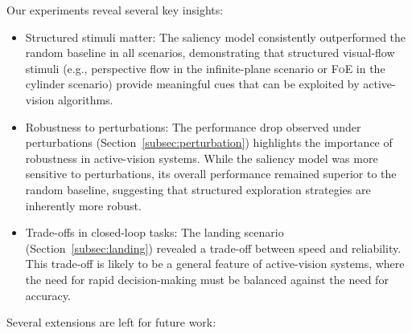 \documentclass[12pt,a4paper]{article}
\newcommand{\FoE}{\textsc{FoE}}  %
\begin{document}
Our experiments reveal several key insights:
\begin{itemize}
    \item Structured stimuli matter: The saliency model consistently outperformed the random baseline in all scenarios, demonstrating that structured visual-flow stimuli (e.g., perspective flow in the infinite-plane scenario or \FoE{} in the cylinder scenario) provide meaningful cues that can be exploited by active-vision algorithms.

    \item Robustness to perturbations: The performance drop observed under perturbations (Section~\ref{subsec:perturbation}) highlights the importance of robustness in active-vision systems. While the saliency model was more sensitive to perturbations, its overall performance remained superior to the random baseline, suggesting that structured exploration strategies are inherently more robust.

    \item Trade-offs in closed-loop tasks: The landing scenario (Section~\ref{subsec:landing}) revealed a trade-off between speed and reliability. This trade-off is likely to be a general feature of active-vision systems, where the need for rapid decision-making must be balanced against the need for accuracy.
\end{itemize}

Several extensions are left for future work:
 
\end{document}
